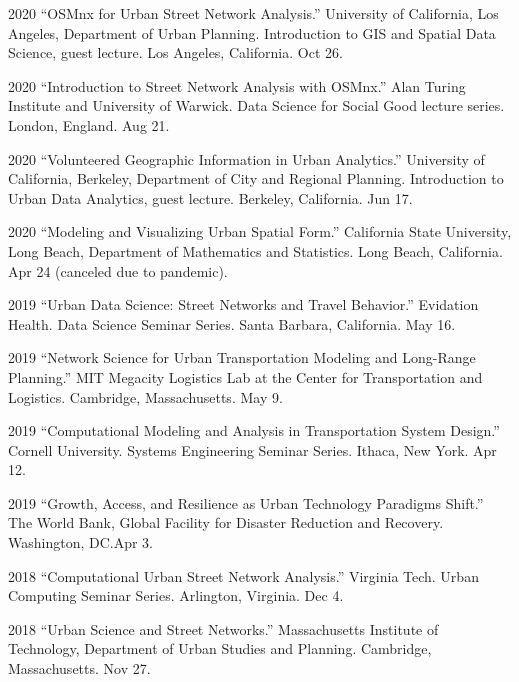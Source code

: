 \documentclass[11pt,letterpaper]{report}
\begin{document}
\begin{tablist}
        \item[2020] \tab{}\enquote{OSMnx for Urban Street Network Analysis.} University of California, Los Angeles, Department of Urban Planning. Introduction to GIS and Spatial Data Science, guest lecture. Los Angeles, California. Oct 26.

        \item[2020] \tab{}\enquote{Introduction to Street Network Analysis with OSMnx.} Alan Turing Institute and University of Warwick. Data Science for Social Good lecture series. London, England. Aug 21.

        \item[2020] \tab{}\enquote{Volunteered Geographic Information in Urban Analytics.} University of California, Berkeley, Department of City and Regional Planning. Introduction to Urban Data Analytics, guest lecture. Berkeley, California. Jun 17.

        \item[2020] \tab{}\enquote{Modeling and Visualizing Urban Spatial Form.} California State University, Long Beach, Department of Mathematics and Statistics. Long Beach, California. Apr 24 (canceled due to pandemic).

        \item[2019] \tab{}\enquote{Urban Data Science: Street Networks and Travel Behavior.} Evidation Health. Data Science Seminar Series. Santa Barbara, California. May 16.

        \item[2019] \tab{}\enquote{Network Science for Urban Transportation Modeling and Long-Range Planning.} MIT Megacity Logistics Lab at the Center for Transportation and Logistics. Cambridge, Massachusetts. May 9.

        \item[2019] \tab{}\enquote{Computational Modeling and Analysis in Transportation System Design.} Cornell University. Systems Engineering Seminar Series. Ithaca, New York. Apr 12.

        \item[2019] \tab{}\enquote{Growth, Access, and Resilience as Urban Technology Paradigms Shift.} The World Bank, Global Facility for Disaster Reduction and Recovery. Washington, DC.\@ Apr 3.

        \item[2018] \tab{}\enquote{Computational Urban Street Network Analysis.} Virginia Tech. Urban Computing Seminar Series. Arlington, Virginia. Dec 4.

        \item[2018] \tab{}\enquote{Urban Science and Street Networks.} Massachusetts Institute of Technology, Department of Urban Studies and Planning. Cambridge, Massachusetts. Nov 27.


\end{tablist}
\end{document}
